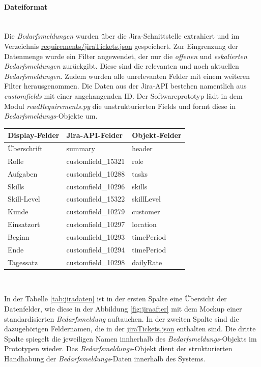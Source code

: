 \paragraph{Dateiformat}\mbox{}\\
Die \emph{Bedarfsmeldungen} wurden über die Jira-Schnittstelle extrahiert und im Verzeichnis \url{requirements/jiraTickets.json} gespeichert. Zur Eingrenzung der Datenmenge wurde ein Filter angewendet, der nur die \emph{offenen} und \emph{eskalierten} \emph{Bedarfsmeldungen} zurückgibt. Diese sind die relevanten und noch aktuellen \emph{Bedarfsmeldungen}. Zudem wurden alle unrelevanten Felder mit einem weiteren Filter herausgenommen. Die Daten aus der Jira-API bestehen namentlich aus \emph{customfields} mit einer angehangenden ID. Der Softwareprototyp lädt in dem Modul \emph{readRequirements.py} die unstrukturierten Fields und formt diese in \emph{Bedarfsmeldungs}-Objekte um.
\begin{center}
	\begin{tabularx}{1\textwidth} { 
			| >{\raggedright\arraybackslash}X 
			| >{\raggedright\arraybackslash}X
			| >{\raggedright\arraybackslash}X | }
		\hline
		Display-Felder & Jira-API-Felder & Objekt-Felder \\
		\hline
		\hline
		Überschrift & summary & header\\
		\hline
		Rolle & customfield\_15321 & role\\
		\hline
		Aufgaben & customfield\_10288 & tasks\\
		\hline
		Skills & customfield\_10296 & skills\\
		\hline
		Skill-Level & customfield\_15322 & skillLevel\\
		\hline
		Kunde & customfield\_10279 & customer\\
		\hline
		Einsatzort & customfield\_10297 & location\\
		\hline
		Beginn & customfield\_10293 & timePeriod\\
		\hline
		Ende & customfield\_10294 & timePeriod\\
		\hline
		Tagessatz & customfield\_10298 & dailyRate\\
		\hline
	\end{tabularx}\\
	\label{tab:jiradaten}
\end{center}
In der Tabelle \ref{tab:jiradaten} ist in der ersten Spalte eine Übersicht der Datenfelder, wie diese in der Abbildung \ref{fig:jiraafter} mit dem Mockup einer standardisierten \emph{Bedarfsmeldung} auftauchen. In der zweiten Spalte sind die dazugehörigen Feldernamen, die in der \url{jiraTickets.json} enthalten sind. Die dritte Spalte spiegelt die jeweiligen Namen innherhalb des  \emph{Bedarfsmeldungs}-Objekts im Prototypen wieder. Das  \emph{Bedarfsmeldungs}-Objekt dient der strukturierten Handhabung der \emph{Bedarfsmeldungs}-Daten innerhalb des Systems.

